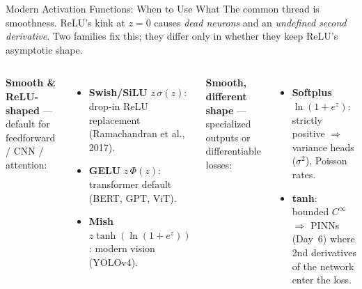 \documentclass[aspectratio=169,11pt]{beamer}
\newcommand{\emphc}[1]{\textcolor{harvardcrimson}{#1}}
\begin{document}
\begin{frame}[shrink=10]{Modern Activation Functions: When to Use What}
{\footnotesize The common thread is \emphc{smoothness}. ReLU's kink at $z{=}0$ causes \textit{dead neurons} and an \textit{undefined second derivative}. Two families fix this; they differ only in whether they keep ReLU's asymptotic shape.}

\begin{columns}[T]
\textbf{\textcolor{softblue}{Smooth \& ReLU-shaped}} {\footnotesize --- default for feedforward / CNN / attention:}
\begin{itemize}\itemsep0pt
    \item[\textcolor{softblue}{$\blacktriangleright$}] {\footnotesize \textbf{Swish/SiLU} $z\,\sigma(z)$: drop-in ReLU replacement (Ramachandran et al., 2017).}
    \item[\textcolor{harvardcrimson}{$\blacktriangleright$}] {\footnotesize \textbf{GELU} $z\,\Phi(z)$: transformer default (BERT, GPT, ViT).}
    \item[\textcolor{softgreen}{$\blacktriangleright$}] {\footnotesize \textbf{Mish} $z\tanh(\ln(1{+}e^z))$: modern vision (YOLOv4).}
\end{itemize}

\vspace{0.1cm}
\textbf{\textcolor{softorange}{Smooth, different shape}} {\footnotesize --- specialized outputs or differentiable losses:}
\begin{itemize}\itemsep0pt
    \item[\textcolor{softorange}{$\blacktriangleright$}] {\footnotesize \textbf{Softplus} $\ln(1{+}e^z)$: strictly positive $\Rightarrow$ variance heads ($\sigma^2$), Poisson rates.}
    \item[\textcolor{uzhblue}{$\blacktriangleright$}] {\footnotesize \textbf{tanh}: bounded $C^\infty$ $\Rightarrow$ PINNs (Day~6) where 2nd derivatives of the network enter the loss.}
\end{itemize}


\end{columns}
\end{frame}
\end{document}
